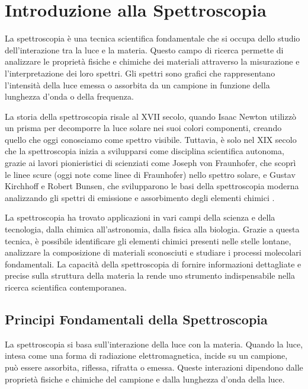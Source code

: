 \documentclass[12pt,a4paper]{report}
\begin{document}
\chapter{Introduzione alla Spettroscopia}

La spettroscopia è una tecnica scientifica fondamentale che si occupa dello studio dell'interazione tra la luce e la materia. Questo campo di ricerca permette di analizzare le proprietà fisiche e chimiche dei materiali attraverso la misurazione e l'interpretazione dei loro spettri. Gli spettri sono grafici che rappresentano l'intensità della luce emessa o assorbita da un campione in funzione della lunghezza d'onda o della frequenza.

La storia della spettroscopia risale al XVII secolo, quando Isaac Newton utilizzò un prisma per decomporre la luce solare nei suoi colori componenti, creando quello che oggi conosciamo come spettro visibile. Tuttavia, è solo nel XIX secolo che la spettroscopia inizia a svilupparsi come disciplina scientifica autonoma, grazie ai lavori pionieristici di scienziati come Joseph von Fraunhofer, che scoprì le linee scure (oggi note come linee di Fraunhofer) nello spettro solare, e Gustav Kirchhoff e Robert Bunsen, che svilupparono le basi della spettroscopia moderna analizzando gli spettri di emissione e assorbimento degli elementi chimici \cite{hollas2004modern}.

La spettroscopia ha trovato applicazioni in vari campi della scienza e della tecnologia, dalla chimica all'astronomia, dalla fisica alla biologia. Grazie a questa tecnica, è possibile identificare gli elementi chimici presenti nelle stelle lontane, analizzare la composizione di materiali sconosciuti e studiare i processi molecolari fondamentali. La capacità della spettroscopia di fornire informazioni dettagliate e precise sulla struttura della materia la rende uno strumento indispensabile nella ricerca scientifica contemporanea.

\section{Principi Fondamentali della Spettroscopia}

La spettroscopia si basa sull'interazione della luce con la materia. Quando la luce, intesa come una forma di radiazione elettromagnetica, incide su un campione, può essere assorbita, riflessa, rifratta o emessa. Queste interazioni dipendono dalle proprietà fisiche e chimiche del campione e dalla lunghezza d'onda della luce.
\end{document}
